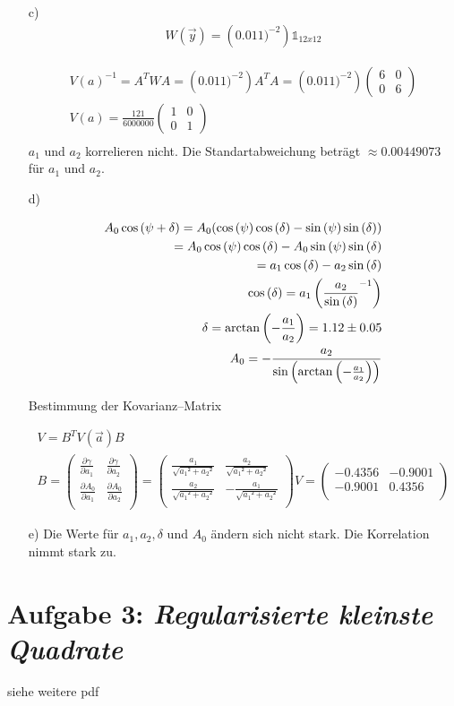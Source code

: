 \begin{itemize}
\item[c)]
\begin{align*}
W(\vec{y}) = \left(0.011)^{-2}\right)\mathds{1}_{12x12}
\end{align*}

\begin{align*}
V(a)^{-1} = A^{T}WA= \left(0.011)^{-2}\right) A^{T}A = \left(0.011)^{-2}\right) \begin{pmatrix}
6 & 0\\
0 & 6
\end{pmatrix}\\
V(a) = \frac{121}{6000000}
\begin{pmatrix}
1 & 0\\
0 & 1
\end{pmatrix}\\
\end{align*}
$a_1$ und $a_2$ korrelieren nicht. Die Standartabweichung beträgt $\approx 0.00449073$ für $a_1$ und $a_2$.

\item[d)]

\begin{align*}
A_0\cos{(\psi+\delta)} = A_0(\cos{(\psi)}\cos{(\delta)}- \sin{(\psi)}\sin{(\delta)})\\
=A_0\cos{(\psi)}\cos{(\delta)}- A_0\sin{(\psi)}\sin{(\delta)}\\
=a_1\cos{(\delta)}- a_2\sin{(\delta)}\\
\cos{(\delta)} = a_1\left(\-\frac{a_2}{\sin{(\delta)}}^{-1}\right)\\
\delta = \arctan{\left(-\frac{a_1}{a_2}\right)} = 1.12\pm 0.05\\
A_0=-\frac{a_2}{\sin{\left(\arctan{\left(-\frac{a_1}{a_2}\right)}\right)}}
\end{align*}

Bestimmung der Kovarianz--Matrix

\begin{align*}
V = B^{T}V(\vec{a})B \\
B = 
\begin{pmatrix}
\frac{\partial \gamma}{\partial a_1}& \frac{\partial \gamma}{\partial a_2} \\
\frac{\partial A_0}{\partial a_1} & \frac{\partial A_0}{\partial a_2}\\
\end{pmatrix}
=
\begin{pmatrix}
\frac{a_1}{\sqrt{{a_1}²+{a_2}²}} & \frac{a_2}{\sqrt{{a_1}²+{a_2}²}} \\
\frac{a_2}{\sqrt{{a_1}²+{a_2}²}} & -\frac{a_1}{\sqrt{{a_1}²+{a_2}²}}\\
\end{pmatrix}
V = 
\begin{pmatrix}
-0.4356 & -0.9001\\
-0.9001 & 0.4356\\
\end{pmatrix}
\end{align*}
\item[e)]
Die Werte für $a_1,a_2,\delta$ und $A_0$ ändern sich nicht stark. Die Korrelation nimmt stark zu.
\end{itemize}
\section*{Aufgabe 3: \emph{Regularisierte kleinste Quadrate}}
siehe weitere pdf
%